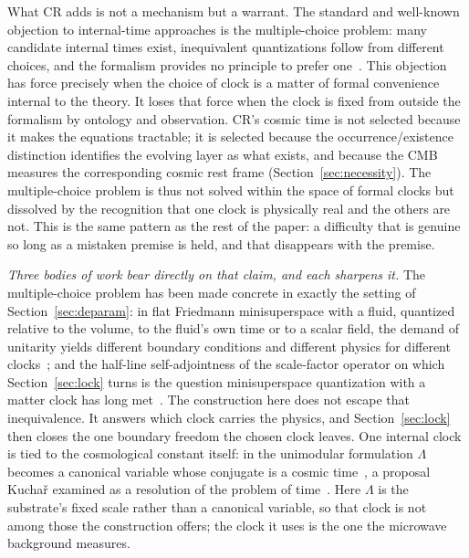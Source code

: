\documentclass[11pt,a4paper]{article}
\theoremstyle{plain}
\theoremstyle{definition}
\theoremstyle{remark}
\begin{document}
What CR adds is not a mechanism but a warrant. The standard and well-known objection to internal-time approaches is the multiple-choice problem: many candidate internal times exist, inequivalent quantizations follow from different choices, and the formalism provides no principle to prefer one~\cite{Kuchar1992, Isham1993}. This objection has force precisely when the choice of clock is a matter of formal convenience internal to the theory. It loses that force when the clock is fixed from outside the formalism by ontology and observation. CR's cosmic time is not selected because it makes the equations tractable; it is selected because the occurrence/existence distinction identifies the evolving layer as what exists, and because the CMB measures the corresponding cosmic rest frame (Section~\ref{sec:necessity}). The multiple-choice problem is thus not solved within the space of formal clocks but dissolved by the recognition that one clock is physically real and the others are not. This is the same pattern as the rest of the paper: a difficulty that is genuine so long as a mistaken premise is held, and that disappears with the premise.

\emph{Three bodies of work bear directly on that claim, and each sharpens it.} The multiple-choice problem has been made concrete in exactly the setting of Section~\ref{sec:deparam}: in flat Friedmann minisuperspace with a fluid, quantized relative to the volume, to the fluid's own time or to a scalar field, the demand of unitarity yields different boundary conditions and different physics for different clocks~\cite{GielenMenendezPidal2022}; and the half-line self-adjointness of the scale-factor operator on which Section~\ref{sec:lock} turns is the question minisuperspace quantization with a matter clock has long met~\cite{FeinbergPeleg1995}. The construction here does not escape that inequivalence. It answers which clock carries the physics, and Section~\ref{sec:lock} then closes the one boundary freedom the chosen clock leaves. One internal clock is tied to the cosmological constant itself: in the unimodular formulation $\Lambda$ becomes a canonical variable whose conjugate is a cosmic time~\cite{Unruh1989, HenneauxTeitelboim1989, UnruhWald1989}, a proposal Kucha\v{r} examined as a resolution of the problem of time~\cite{Kuchar1991}. Here $\Lambda$ is the substrate's fixed scale rather than a canonical variable, so that clock is not among those the construction offers; the clock it uses is the one the microwave background measures.
\end{document}
